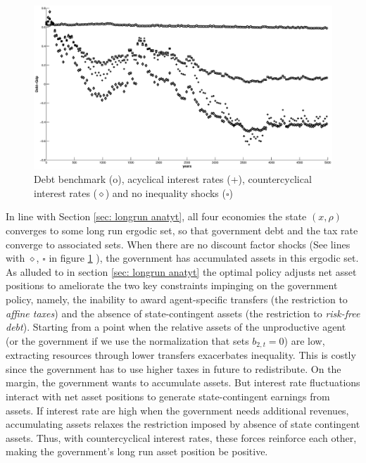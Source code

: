\documentclass[thmsb,11pt]{article}
\begin{document}
{  \begin{figure}[htp]
 \centering
 \includegraphics[width=\textwidth]{Draft25Graphs/LongSimulations.eps}
 \caption{ Debt benchmark (o), acyclical interest rates (+), countercyclical interest rates (\scriptsize $\diamond$) \normalsize and no inequality shocks (\scriptsize $\square$)\normalsize }
 \label{fig:LongSimulations}
 \end{figure}

\smallskip


In line with Section \ref{sec: longrun anatyt}, all four economies the state $(x,\rho)$   converges to some long run
ergodic set, so that government debt and the tax rate converge to associated sets. When there are no discount factor shocks
(See lines with {\scriptsize $\diamond$, $\square$ \normalsize} in figure \ref{fig:LongSimulations} ),
the government has accumulated assets in this ergodic set. As alluded to in section \ref{sec: longrun anatyt} %
 the optimal policy adjusts  net asset
positions to ameliorate the two key constraints impinging  on the government policy, namely,
the inability to award agent-specific transfers (the restriction to \emph{affine taxes}) and the  absence of state-contingent assets (the
restriction to \emph {risk-free debt}). Starting from a point when the
relative assets of the unproductive agent (or the government if we use the
 normalization that sets $b_{2,t} = 0$) are low, extracting resources through lower
transfers exacerbates inequality. This is costly since the government has to
use higher taxes in future to redistribute. On the margin, the government wants to accumulate assets. But  interest rate
fluctuations interact with net asset positions to generate state-contingent  earnings
from assets. If interest rate are high when the government needs additional
revenues, accumulating assets relaxes the restriction imposed by absence
of state contingent assets. Thus, with countercyclical interest rates, these
forces reinforce each other, making the government's  long run asset position be positive.

}
\end{document}
